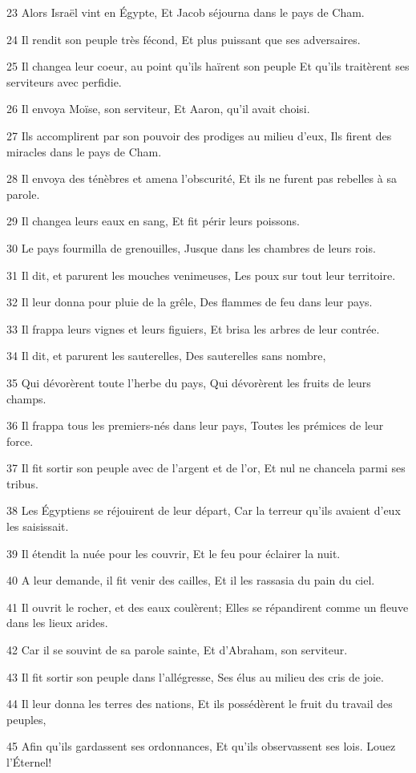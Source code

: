 \par 23 Alors Israël vint en Égypte, Et Jacob séjourna dans le pays de Cham.
\par 24 Il rendit son peuple très fécond, Et plus puissant que ses adversaires.
\par 25 Il changea leur coeur, au point qu'ils haïrent son peuple Et qu'ils traitèrent ses serviteurs avec perfidie.
\par 26 Il envoya Moïse, son serviteur, Et Aaron, qu'il avait choisi.
\par 27 Ils accomplirent par son pouvoir des prodiges au milieu d'eux, Ils firent des miracles dans le pays de Cham.
\par 28 Il envoya des ténèbres et amena l'obscurité, Et ils ne furent pas rebelles à sa parole.
\par 29 Il changea leurs eaux en sang, Et fit périr leurs poissons.
\par 30 Le pays fourmilla de grenouilles, Jusque dans les chambres de leurs rois.
\par 31 Il dit, et parurent les mouches venimeuses, Les poux sur tout leur territoire.
\par 32 Il leur donna pour pluie de la grêle, Des flammes de feu dans leur pays.
\par 33 Il frappa leurs vignes et leurs figuiers, Et brisa les arbres de leur contrée.
\par 34 Il dit, et parurent les sauterelles, Des sauterelles sans nombre,
\par 35 Qui dévorèrent toute l'herbe du pays, Qui dévorèrent les fruits de leurs champs.
\par 36 Il frappa tous les premiers-nés dans leur pays, Toutes les prémices de leur force.
\par 37 Il fit sortir son peuple avec de l'argent et de l'or, Et nul ne chancela parmi ses tribus.
\par 38 Les Égyptiens se réjouirent de leur départ, Car la terreur qu'ils avaient d'eux les saisissait.
\par 39 Il étendit la nuée pour les couvrir, Et le feu pour éclairer la nuit.
\par 40 A leur demande, il fit venir des cailles, Et il les rassasia du pain du ciel.
\par 41 Il ouvrit le rocher, et des eaux coulèrent; Elles se répandirent comme un fleuve dans les lieux arides.
\par 42 Car il se souvint de sa parole sainte, Et d'Abraham, son serviteur.
\par 43 Il fit sortir son peuple dans l'allégresse, Ses élus au milieu des cris de joie.
\par 44 Il leur donna les terres des nations, Et ils possédèrent le fruit du travail des peuples,
\par 45 Afin qu'ils gardassent ses ordonnances, Et qu'ils observassent ses lois. Louez l'Éternel!

